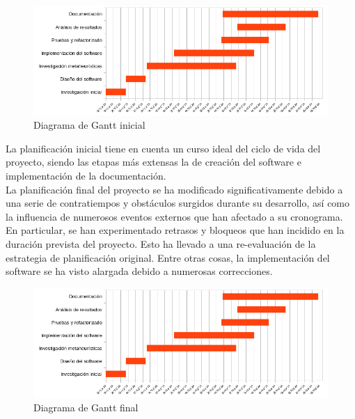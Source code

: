 \begin{figure}[htp]
      \begin{center}
            \includegraphics[width=1\textwidth]{imagenes/gantt-init.png}
      \end{center}
      \caption{Diagrama de Gantt inicial}
\end{figure}

La planificación inicial tiene en cuenta un curso ideal del ciclo de vida del proyecto, siendo las etapas más extensas la de creación del software e implementación de la documentación.\\[6pt]
La planificación final del proyecto se ha modificado significativamente debido a una serie de contratiempos y obstáculos surgidos durante su desarrollo, así como la influencia de numerosos eventos externos que han afectado a su cronograma. En particular, se han experimentado retrasos y bloqueos que han incidido en la duración prevista del proyecto. Esto ha llevado a una re-evaluación de la estrategia de planificación original. Entre otras cosas, la implementación del software se ha visto alargada debido a numerosas correcciones.

\begin{figure}[htp]
      \begin{center}
            \includegraphics[width=1\textwidth]{imagenes/gantt-init.png}
      \end{center}
      \caption{Diagrama de Gantt final}
\end{figure}

